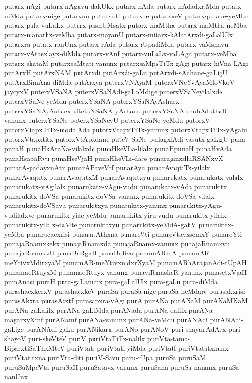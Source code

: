 {putarx-nAgi
putarx-nAguvu-dakUkx
putarx-nAda
putarx-nAdadxriMda
putarx-niMda
putarx-nige
putarxnu
putarxnU
putarxne
putarxneV
putarx-palane-yeMba
putarx-pala-vuLaLx
putarx-pashUMsatx
putarx-maMtha
putarx-maMtha-neMba
putarx-manathx-veMba
putarx-mayanU
putarx-mitarx-kAlatArxdi-gaLalUlx
putarxra
putarx-ranUnx
putarx-rAda
putarx-rUpadiMda
putarx-vaMshavu
putarx-vAtasxlayx-diMda
putarx-vAnf
putarx-vuLaLx-vaLAgu
putarx-veMba
putarx-shataM
putarxsaMtati-yanunx
putarxsaMpaTiTx-gAgi
putarx-hiVna-LAgi
putArxH
putArxNAM
putArxdi
putArxdi-gaLu
putArxdi-sAdhane-gaLigU
putArxBimAna-diMda
putArxya
puterxVNAyaM
puterxVNeYvAyaMloVkoV-jayoyxV
puterxVSaNA
puterxVSaNAdi-gaLoMdige
puterxVSaNeyilalxde
puterxVSaNe-yeMdu
puterxYSaNA
puterxYSaNAyAshacx
puterxYSaNAyAshacx-vitetxYSaNA-yAshacx
puterxYSaNA-shabAdxthaR-vanunx
puterxYSaNe
puterxYSaNeyU
puterxYSaNe-yeMdu
putorxV
putorxVtapxTiTx-modalAda
putorxVtapxTiTx-yanunx
putorxVtapxTiTx-yAgalu
putorxVtapxtitx
putorxVtApxdane
puteV-SaNe
pudagxlAdi-vasutx-gaLigU
puna
punaH
punaHkAraNa-vilalxde
punaHkeVLa-lilalx
punaHpunaH
punaHvAda
punaHsapaRvu
punaHseVjaH
punaHheVLi-dare
punaraginxdhiRSANxyX
punarA-padayxnAtx
punarABaveVtf
punarAyu
punarAvaqtiTx-yilalx
punarAvaqtitx
punarAvaqtitxM
punarAvaqtitxyu
punarukatx
punarukatx-valalx
punarukatx-vAgilalx
punarukatx-vAgu-vudu
punarukatx-vAda
punarukitx
punarukitx-doVSa
punarukitx-doVSa-vanunx
punarukitx-doVSa-vilalx
punarukitx-doVSavu
punarukitxya
punarukitx-yanunx
punarukitx-yAgu-vudilalxve
punarukitx-yide-yeMdu
punarukitx-yiru-vudu
punarukitx-yilalx
punarukitx-yilalx-daMte
punarukitxyu
punarukitx-yeMdA-galiV
punarukitx-yeMba
punarucacxrisi
punarutAthxna
punareVti
punareVtayxsemxY
punareYti
punajaRnamxkekx
punajaRnamxda
punajaRnamx-vanunx
punajaRnamxvu
punajaRnamxvU
punaBaRgaH
punaBaRva
punamARmA
punamAR-meYtivxMdirxyaM
punamAR-meYtivxnidxrXyaM
punamARhArajanAdi-rUpAH
punamaqRtuyxM
punamaqRtuyx-vanunx
punaviRmasheR-yanunx
punasetxVjaH
pumAnasi
puraH
pura-gaLanunx
pura-gaLalUlx
pura-gaLu
pura-diMda
purashacxkerxV
purashacxkeV
puraSa
puraSa-nige
puraSa-neMdare
purasakxrisi
purasAkxra
purasAtxtf
purasapxra-vAgi
purA
purANa
purANaM
purANaMKaM
purANa-gaLalilx
purANa-gaLiMda
purANada
purANa-dalilx
purANa-magarxyXmf
purANamf
purANa-vanunx
purANa-veMdu
purANAdi
purANAdi-gaLige
purANAdi-gaLu
purANikaru
purANo
purANoV
puri-shayanAdAvx
puri-shayoV
puri-sheVteV
puriV
puriVtaTiTx-nalilx
puriVta-tama-BiparxtiSaThxMteV
puriVtati
puriVtati-yiMda
puriVtatf
puriVtatatxnunx
puriVtatitxna
puriVta-diti
puriV-Savu
puru-rUpa
puruSa
puruSaM
puruSaMpeVta
puruSaH
puruSatavx-vanunx
puruSana
puruSa-nanunx
puruSa-nanUnx
}
